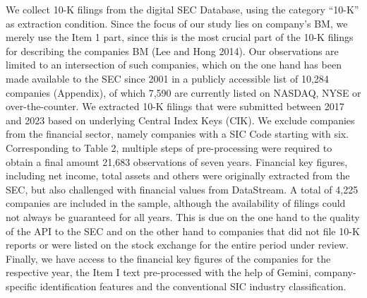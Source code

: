 \documentclass[
]{article}
\begin{document}
We collect 10-K filings from the digital SEC Database, using the
category ``10-K'' as extraction condition. Since the focus of our study
lies on company's BM, we merely use the Item 1 part, since this is the
most crucial part of the 10-K filings for describing the companies BM
(Lee and Hong 2014). Our observations are limited to an intersection of
such companies, which on the one hand has been made available to the SEC
since 2001 in a publicly accessible list of 10,284 companies (Appendix),
of which 7,590 are currently listed on NASDAQ, NYSE or over-the-counter.
We extracted 10-K filings that were submitted between 2017 and 2023
based on underlying Central Index Keys (CIK). We exclude companies from
the financial sector, namely companies with a SIC Code starting with
six. Corresponding to Table 2, multiple steps of pre-processing were
required to obtain a final amount 21,683 observations of seven years.
Financial key figures, including net income, total assets and others
were originally extracted from the SEC, but also challenged with
financial values from DataStream. A total of 4,225 companies are
included in the sample, although the availability of filings could not
always be guaranteed for all years. This is due on the one hand to the
quality of the API to the SEC and on the other hand to companies that
did not file 10-K reports or were listed on the stock exchange for the
entire period under review. Finally, we have access to the financial key
figures of the companies for the respective year, the Item I text
pre-processed with the help of Gemini, company-specific identification
features and the conventional SIC industry classification.
\end{document}
